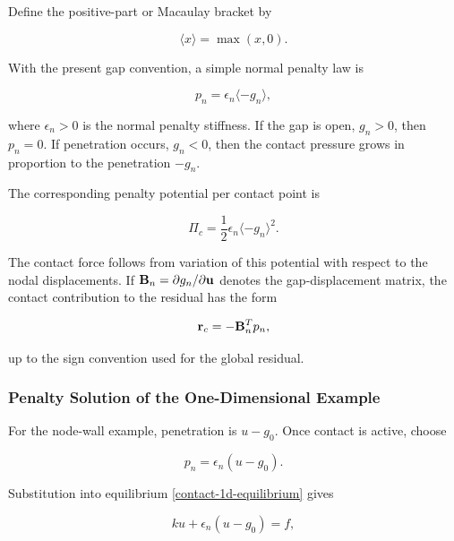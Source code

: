 Define the positive-part or Macaulay bracket by

\begin{equation}
    \langle x \rangle = \max(x,0).
\end{equation}

With the present gap convention, a simple normal penalty law is

\begin{bbox}
    \begin{equation}\label{contact-normal-penalty-law}
        p_n = \epsilon_n \langle -g_n \rangle,
    \end{equation}
\end{bbox}

where $ \epsilon_n > 0 $ is the normal penalty stiffness. If the gap is open,
$ g_n > 0 $, then $ p_n = 0 $. If penetration occurs, $ g_n < 0 $, then the
contact pressure grows in proportion to the penetration $ -g_n $.

The corresponding penalty potential per contact point is

\begin{equation}\label{contact-normal-penalty-potential}
    \Pi_c = \frac{1}{2} \epsilon_n
    \langle -g_n \rangle^2.
\end{equation}

The contact force follows from variation of this potential with respect to the
nodal displacements. If $ \mathbf{B}_n = \partial g_n / \partial \mathbf{u} $ denotes the
gap-displacement matrix, the contact contribution to the residual has the form

\begin{equation}
    \mathbf{r}_c = -\mathbf{B}_n^T p_n,
\end{equation}

up to the sign convention used for the global residual.

\subsubsection{Penalty Solution of the One-Dimensional Example}

For the node-wall example, penetration is $ u-g_0 $. Once contact is active,
choose

\begin{equation}
    p_n = \epsilon_n (u-g_0).
\end{equation}

Substitution into equilibrium \eqref{contact-1d-equilibrium} gives

\begin{equation}
    k u + \epsilon_n (u-g_0) = f,
\end{equation}

